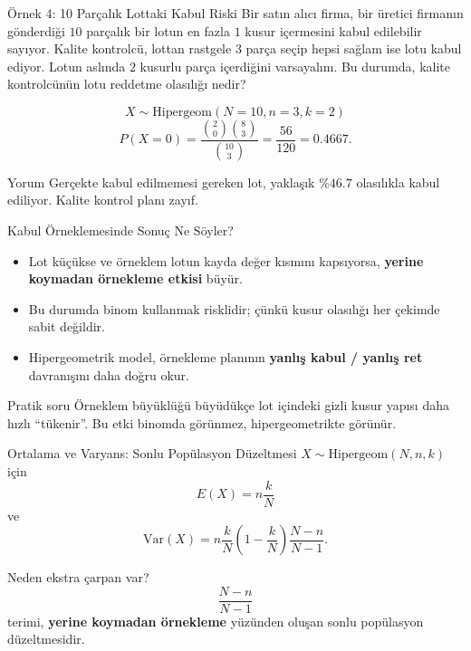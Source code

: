 \documentclass[light]{lutbeamer}
\begin{document}
\begin{frame}{Örnek 4: 10 Parçalık Lottaki Kabul Riski}
    \small
    Bir satın alıcı firma, bir üretici firmanın gönderdiği \(10\) parçalık bir lotun en fazla \(1\) kusur içermesini kabul edilebilir sayıyor. Kalite kontrolcü, lottan rastgele \(3\) parça seçip hepsi sağlam ise lotu kabul ediyor. Lotun aslında \(2\) kusurlu parça içerdiğini varsayalım. Bu durumda, kalite kontrolcünün lotu reddetme olasılığı nedir?

    \[
    X \sim \text{Hipergeom}(N=10,n=3,k=2)
    \]
    \[
    P(X=0)=\frac{\binom{2}{0}\binom{8}{3}}{\binom{10}{3}}=\frac{56}{120}=0.4667.
    \]

    \begin{exampleblock}{Yorum}
        Gerçekte kabul edilmemesi gereken lot, yaklaşık \(\%46.7\) olasılıkla kabul ediliyor. Kalite kontrol planı zayıf.
    \end{exampleblock}
\end{frame}

\begin{frame}{Kabul Örneklemesinde Sonuç Ne Söyler?}
    \small
    \begin{itemize}
        \item Lot küçükse ve örneklem lotun kayda değer kısmını kapsıyorsa, \textbf{yerine koymadan örnekleme etkisi} büyür.
        \item Bu durumda binom kullanmak risklidir; çünkü kusur olasılığı her çekimde sabit değildir.
        \item Hipergeometrik model, örnekleme planının \textbf{yanlış kabul / yanlış ret} davranışını daha doğru okur.
    \end{itemize}

    \begin{block}{Pratik soru}
        Örneklem büyüklüğü büyüdükçe lot içindeki gizli kusur yapısı daha hızlı ``tükenir''. Bu etki binomda görünmez, hipergeometrikte görünür.
    \end{block}
\end{frame}

\begin{frame}{Ortalama ve Varyans: Sonlu Popülasyon Düzeltmesi}
    \small
    \(X \sim \text{Hipergeom}(N,n,k)\) için
    \[
    E(X)=n\frac{k}{N}
    \]
    ve
    \[
    \mathrm{Var}(X)=n\frac{k}{N}\left(1-\frac{k}{N}\right)\frac{N-n}{N-1}.
    \]

    \begin{block}{Neden ekstra çarpan var?}
        \[
        \frac{N-n}{N-1}
        \]
        terimi, \textbf{yerine koymadan örnekleme} yüzünden oluşan sonlu popülasyon düzeltmesidir.
    \end{block}
\end{frame}
\end{document}
